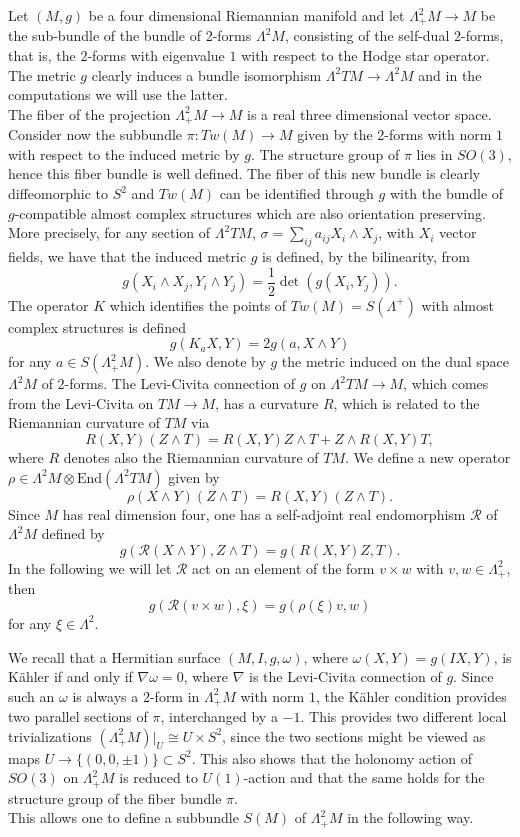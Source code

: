 \documentclass[11pt]{amsart}
\theoremstyle{definition}
\theoremstyle{plain}
\theoremstyle{definition}
\theoremstyle{plain}
\theoremstyle{remark}
\theoremstyle{plain}
\newcommand{\n}{\nabla}
\begin{document}
Let $(M,g)$ be a four dimensional Riemannian manifold and let $\Lambda^2_+ M \to M$ be the sub-bundle of the bundle of 2-forms $\Lambda^2M$, consisting of the self-dual  $2$-forms, that is,   the $2$-forms  with eigenvalue $1$ with respect to the Hodge star  operator. The metric $g$ clearly induces a bundle isomorphism $\Lambda^2 TM \to  \Lambda^2 M$  and in the computations we will use the latter. \\
The fiber of the projection $\Lambda^2_+ M \to M$  is a real three dimensional vector space. Consider now the subbundle $\pi: Tw(M) \to M$ given by the $2$-forms  with norm $1$  with respect to  the induced metric by $g$. The structure group of $\pi$  lies in $SO(3)$, hence this fiber bundle is well defined. The fiber of this new bundle is clearly diffeomorphic to $S^2$ and $Tw(M)$  can be identified through $g$ with  the bundle of $g$-compatible almost complex structures which are also orientation preserving. More precisely, 
 for any section of  $\Lambda^2 TM$,   $\sigma= \sum_{ij} a_{ij} X_i \wedge X_j$, with $X_i$  vector fields,  we have that the induced metric $g$    is defined, by the  bilinearity, from
\[
g(X_i\wedge X_j, Y_i \wedge Y_j)=\frac{1}{2}\det(g(X_i,Y_j)).
\]
The operator $K$ which identifies the points of $Tw(M) = S(\Lambda^+)$ with almost complex structures is defined
\[
g(K_a X,Y)=2g(a, X\wedge Y)
\]
for any $a\in S(\Lambda^2_+M)$.  We also denote by $g$ the metric induced on  the dual space $\Lambda^2 M$ of $2$-forms.
The Levi-Civita connection of $g$ on  $\Lambda^2 TM \to M$, which comes from the Levi-Civita on $TM \to M$, has a curvature $R$, which is related to the Riemannian curvature of $TM$ via
\[
R(X,Y) (Z \wedge T)= R(X, Y) Z \wedge T + Z \wedge R(X, Y)  T,
\]
where $R$   denotes also the Riemannian curvature of $TM$.
We define a new operator $\rho \in  \Lambda^2 M \otimes \text{End}(\Lambda^2 TM)$ given by
\[
\rho(X \wedge Y)(Z \wedge T)=R(X,Y)(Z \wedge T).
\]
Since $M$ has real dimension four, one has a self-adjoint real endomorphism  $\mathcal{R}$  of $\Lambda^2 M$ defined by
\[
g(\mathcal{R}(X\wedge Y), Z \wedge T)=g(R(X, Y) Z, T).
\]
In the following we will let $\mathcal{R}$ act on an element of the form $v\times w$ with $v,w\in \Lambda^2_+$,  then
\[
g(\mathcal{R}(v\times w), \xi ) =   g  (\rho ( \xi  )v,  w    )
\]
for any $\xi \in\Lambda^2$.



We  recall  that a Hermitian surface  $(M, I, g,\omega)$, where $\omega(X,Y)=g(IX,Y)$,  is K\"ahler if and only if $\n \omega=0$, where $\n$ is the Levi-Civita connection   of $g$. Since such an $\omega$ is always a $2$-form in  $\Lambda^2_+ M$ with norm $1$, the K\"ahler condition provides two parallel sections of $\pi$, interchanged by a $-1$. This provides two different local trivializations $(\Lambda^2_+ M)|_U \cong  U \times S^2$, since the two sections might be viewed as maps $U  \to \{  (0,0,\pm 1)  \} \subset S^2$. This also shows that the holonomy action of $SO(3)$ on $\Lambda^2_+ M$ is reduced to $U(1)$-action and that the same holds for the structure group of the fiber bundle $\pi$. \\
This allows one to define a subbundle $S(M)$ of $\Lambda^2_+ M$ in the following way. 
\end{document}
